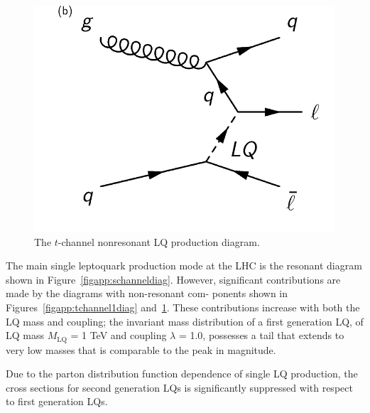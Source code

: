 \begin{figure}[!Hh]
       \centering
       \includegraphics[scale=0.65]{Figures/tchannel2.pdf} 
       \caption[The $t$-channel nonresonant LQ production diagram.]{The $t$-channel nonresonant LQ production diagram.}
\label{figapp:tchannel2diag}
\end{figure}

The main single leptoquark production mode at the LHC is the resonant diagram shown in
Figure~\ref{figapp:schanneldiag}. However, significant contributions are made by the diagrams with non-resonant com-
ponents shown in Figures~\ref{figapp:tchannel1diag} and~\ref{figapp:tchannel2diag}. These contributions increase with both the LQ mass and coupling;
the invariant mass distribution of a first generation LQ, of LQ mass $M_{\text{LQ}}$ = 1 TeV and coupling
$\lambda$ = 1.0, possesses a tail that extends to very low masses that is comparable to the peak in
magnitude.  

Due to the parton distribution function dependence of single LQ production, the cross sections for second generation LQs is significantly suppressed with respect to first generation LQs.  

